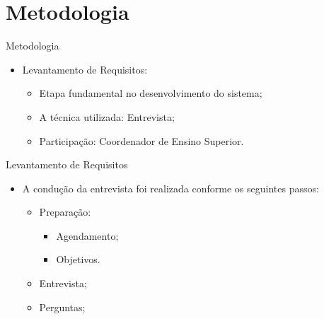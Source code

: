 \section{Metodologia}

\begin{frame}{Metodologia}
    \begin{itemize}
        \item Levantamento de Requisitos: \vspace{0.5cm}
              \begin{itemize}
                  \item Etapa fundamental no desenvolvimento do sistema; \vspace{0.5cm}
                  \item A técnica utilizada: Entrevista; \vspace{0.5cm}
                  \item Participação: Coordenador de Ensino Superior. \vspace{0.5cm}
              \end{itemize}
    \end{itemize}
\end{frame}

\begin{frame}{Levantamento de Requisitos}
    \begin{itemize}
        \item A condução da entrevista foi realizada conforme os seguintes passos: \vspace{0.5cm}
              \begin{itemize}
                  \item Preparação: \vspace{0.5cm}
                        \begin{itemize}
                            \item Agendamento; \vspace{0.5cm}
                            \item Objetivos. \vspace{0.5cm}
                        \end{itemize}
                  \item Entrevista; \vspace{0.5cm}
                  \item Perguntas; \vspace{0.5cm}
              \end{itemize}
    \end{itemize}
\end{frame}


